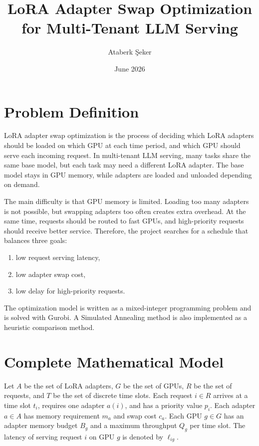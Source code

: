 \documentclass[12pt]{article}
\title{LoRA Adapter Swap Optimization for Multi-Tenant LLM Serving}
\author{Ataberk Şeker}
\date{June 2026}
\begin{document}
\maketitle

\section{Problem Definition}

LoRA adapter swap optimization is the process of deciding which LoRA adapters
should be loaded on which GPU at each time period, and which GPU should serve
each incoming request. In multi-tenant LLM serving, many tasks share the same
base model, but each task may need a different LoRA adapter. The base model
stays in GPU memory, while adapters are loaded and unloaded depending on demand.

The main difficulty is that GPU memory is limited. Loading too many adapters is
not possible, but swapping adapters too often creates extra overhead. At the
same time, requests should be routed to fast GPUs, and high-priority requests
should receive better service. Therefore, the project searches for a schedule
that balances three goals:

\begin{enumerate}[label=\arabic*.]
    \item low request serving latency,
    \item low adapter swap cost,
    \item low delay for high-priority requests.
\end{enumerate}

The optimization model is written as a mixed-integer programming problem and is
solved with Gurobi. A Simulated Annealing method is also implemented as a
heuristic comparison method.

\section{Complete Mathematical Model}

Let $A$ be the set of LoRA adapters, $G$ be the set of GPUs, $R$ be the set of
requests, and $T$ be the set of discrete time slots. Each request $i \in R$
arrives at a time slot $t_i$, requires one adapter $a(i)$, and has a priority
value $p_i$. Each adapter $a \in A$ has memory requirement $m_a$ and swap cost
$c_a$. Each GPU $g \in G$ has an adapter memory budget $B_g$ and a maximum
throughput $Q_g$ per time slot. The latency of serving request $i$ on GPU $g$
is denoted by $\ell_{ig}$.
\end{document}
